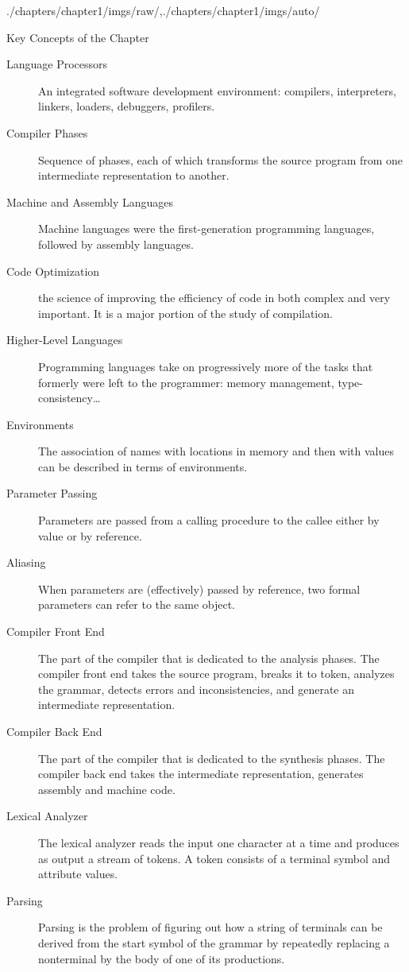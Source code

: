 \begin{graphicspathcontext}{{./chapters/chapter1/imgs/raw/},{./chapters/chapter1/imgs/auto/}}
\begin{bibunit}[apalike]
\tableofcontentslide[sectionstyle={show/shaded},subsectionstyle={hide/hide/hide},subsubsectionstyle={hide/hide/hide/hide}]

\begin{frame}[t]{Key Concepts of the Chapter}
	\begin{description}
	\item[Language Processors] An integrated software development environment: compilers, interpreters, linkers, loaders, debuggers, profilers.
	\item[Compiler Phases] Sequence of phases, each of which transforms the source program from one intermediate representation to another.
	\item[Machine and Assembly Languages] Machine languages were the first-generation programming languages, followed by assembly languages.
	\item[Code Optimization] the science of improving the efficiency of code in both complex and very important. It is a major portion of the study of compilation.
	\item[Higher-Level Languages] Programming languages take on progressively more of the tasks that formerly were left to the programmer: memory management, type-consistency\dots
	\item[Environments] The association of names with locations in memory and then with values can be described in terms of environments.
	\item[Parameter Passing] Parameters are passed from a calling procedure to the callee either by value or by reference.
	\item[Aliasing] When parameters are (effectively) passed by reference, two formal parameters can refer to the same object.
	\item[Compiler Front End] The part of the compiler that is dedicated to the analysis phases. The compiler front end takes the source program, breaks it to token, analyzes the grammar, detects errors and inconsistencies, and generate an intermediate representation.
	\item[Compiler Back End] The part of the compiler that is dedicated to the synthesis phases. The compiler back end takes the intermediate representation, generates assembly and machine code.
	\item[Lexical Analyzer] The lexical analyzer reads the input one character at a time and produces as output a stream of tokens. A token consists of a terminal symbol and attribute values.
	\item[Parsing] Parsing is the problem of figuring out how a string of terminals can be derived from the start symbol of the grammar by repeatedly replacing a nonterminal by the body of one of its productions.

\end{description}
\end{frame}
\end{bibunit}
\end{graphicspathcontext}
